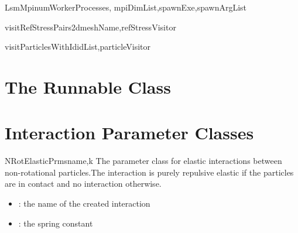 \documentclass{manual}
\begin{document}
\begin{classdesc}{LsmMpi}{numWorkerProcesses, mpiDimList,spawnExe,spawnArgList}
\begin{methoddesc}{visitRefStressPairs2d}{meshName,refStressVisitor}
\end{methoddesc}

\begin{methoddesc}{visitParticlesWithId}{idList,particleVisitor}
\end{methoddesc}

\end{classdesc}

\section{The Runnable Class}
\label{sec::runnable}

\section{Interaction Parameter Classes}
\label{sec::params}

\begin{classdesc}{NRotElasticPrms}{name,k}
The parameter class for elastic interactions between non-rotational particles.The interaction is purely repulsive elastic if the particles are in contact and no interaction otherwise.
\begin{itemize}
\item {} : the name of the created interaction
\item {} :  the spring constant
\end{itemize}
\end{classdesc}
\end{document}
